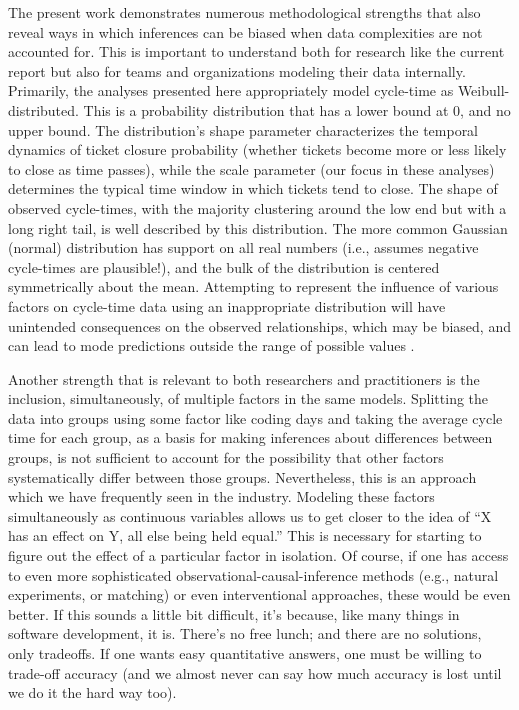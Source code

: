 \documentclass[
  sn-mathphys-ay,
]{sn-jnl}
\begin{document}
The present work demonstrates numerous methodological strengths that
also reveal ways in which inferences can be biased when data
complexities are not accounted for. This is important to understand both
for research like the current report but also for teams and
organizations modeling their data internally. Primarily, the analyses
presented here appropriately model cycle-time as Weibull-distributed.
This is a probability distribution that has a lower bound at 0, and no
upper bound. The distribution's shape parameter characterizes the
temporal dynamics of ticket closure probability (whether tickets become
more or less likely to close as time passes), while the scale parameter
(our focus in these analyses) determines the typical time window in
which tickets tend to close. The shape of observed cycle-times, with the
majority clustering around the low end but with a long right tail, is
well described by this distribution. The more common Gaussian (normal)
distribution has support on all real numbers (i.e., assumes negative
cycle-times are plausible!), and the bulk of the distribution is
centered symmetrically about the mean. Attempting to represent the
influence of various factors on cycle-time data using an inappropriate
distribution will have unintended consequences on the observed
relationships, which may be biased, and can lead to mode predictions
outside the range of possible values
\citep{collettModellingSurvivalData1994, lawlessStatisticalModelsMethods2003, mcelreathStatisticalRethinkingBayesian2020, nelsonAppliedLifeData1982}.

Another strength that is relevant to both researchers and practitioners
is the inclusion, simultaneously, of multiple factors in the same
models. Splitting the data into groups using some factor like coding
days and taking the average cycle time for each group, as a basis for
making inferences about differences between groups, is not sufficient to
account for the possibility that other factors systematically differ
between those groups. Nevertheless, this is an approach which we have
frequently seen in the industry. Modeling these factors simultaneously
as continuous variables allows us to get closer to the idea of ``X has
an effect on Y, all else being held equal.'' This is necessary for
starting to figure out the effect of a particular factor in isolation.
Of course, if one has access to even more sophisticated
observational-causal-inference methods (e.g., natural experiments, or
matching) or even interventional approaches, these would be even better.
If this sounds a little bit difficult, it's because, like many things in
software development, it is. There's no free lunch; and there are no
solutions, only tradeoffs. If one wants easy quantitative answers, one
must be willing to trade-off accuracy (and we almost never can say how
much accuracy is lost until we do it the hard way too).
\end{document}
